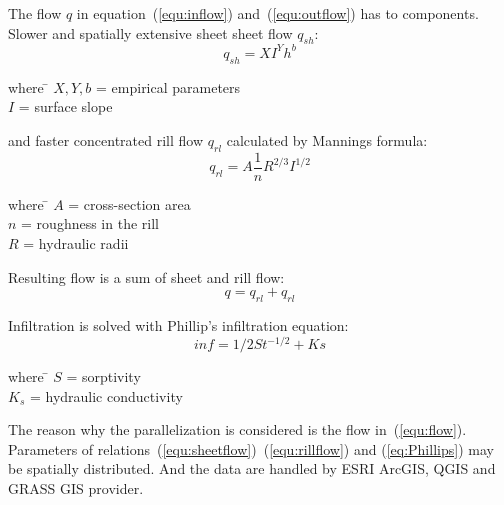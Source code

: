 The flow $q$ in equation~(\ref{equ:inflow}) and~(\ref{equ:outflow}) has to components. Slower and spatially extensive sheet sheet flow $q_{sh}$:
\begin{equation}\label{equ:sheetflow}
    q_{sh} = XI^Yh^b
\end{equation}
\begin{tabbing} 
where \hspace{0.6cm} \= $X,Y,b$ = empirical parameters\\
\> $I$ = surface slope
\end{tabbing}
and faster concentrated rill flow $q_{rl}$ calculated by Mannings formula:
\begin{equation}\label{equ:rillflow}
    q_{rl} = A\frac{1}{n} R^{2/3} I^{1/2}
\end{equation}
\begin{tabbing} 
where \hspace{0.6cm} \= $A$ = cross-section area\\
\> $n$ = roughness in the rill\\
\> $R$ = hydraulic radii
\end{tabbing}
Resulting flow is a sum of sheet and rill flow:
\begin{equation}\label{equ:flow}
    q = q_{rl} + q_{rl}
\end{equation}

Infiltration is solved with Phillip's infiltration equation:
\begin{equation}\label{eq:Phillips}
    inf = 1/2St^{-1/2} + Ks
\end{equation}
\begin{tabbing} 
where \hspace{0.6cm} \= $S$ = sorptivity\\
\> $K_s$ = hydraulic conductivity
\end{tabbing}

The reason why the parallelization is considered is the flow in~(\ref{equ:flow}). Parameters of relations~(\ref{equ:sheetflow})~(\ref{equ:rillflow}) and (\ref{eq:Phillips}) may be spatially distributed. And the data are handled by ESRI ArcGIS, QGIS and GRASS GIS provider. 







